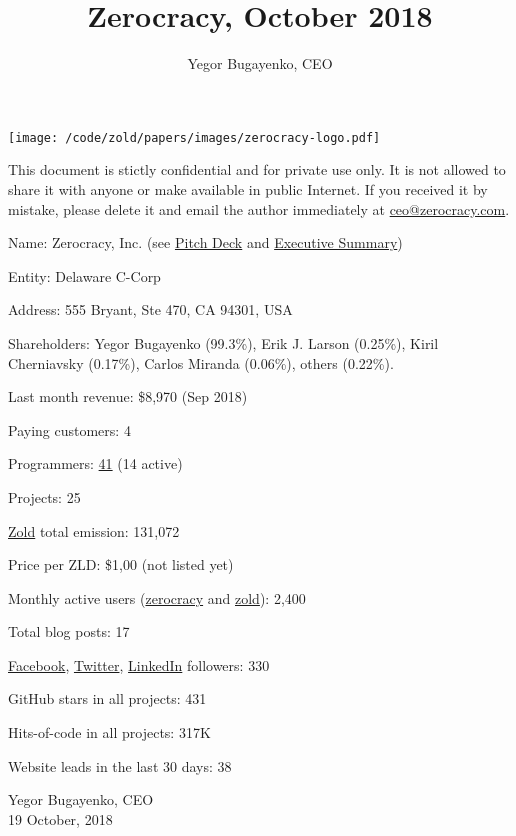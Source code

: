 \documentclass{main}
\title{Zerocracy, October 2018}
\author{Yegor Bugayenko, CEO}
\begin{document}
\texttt{[image: /code/zold/papers/images/zerocracy-logo.pdf]}

{\small
\colorbox{zred}{}
This document is stictly confidential and for private use only.
It is not allowed to share it with anyone or make available in public
Internet. If you received it by mistake, please delete it and email the author
immediately at \href{mailto:ceo@zerocracy.com}{ceo@zerocracy.com}.}

\vspace{2em}

Name: Zerocracy, Inc. (see
  \href{http://papers.zold.io/zerocracy-deck.pdf}{Pitch Deck} and
  \href{http://papers.zold.io/executive-summary.pdf}{Executive Summary})

Entity: Delaware C-Corp

Address: 555 Bryant, Ste 470, CA 94301, USA

Shareholders:
  Yegor Bugayenko (99.3\%),
  Erik J. Larson (0.25\%),
  Kiril Cherniavsky (0.17\%),
  Carlos Miranda (0.06\%),
  others (0.22\%).

Last month revenue: \$8,970 (Sep 2018)

Paying customers: 4

Programmers: \href{https://www.0crat.com/team}{41} (14 active)

Projects: 25

\href{https://www.zold.io}{Zold} total emission: 131,072

Price per ZLD: \$1,00 (not listed yet)

Monthly active users (\href{https://www.zerocracy.com}{zerocracy} and \href{https://www.zold.io}{zold}): 2,400

Total blog posts: 17

\href{https://www.facebook.com/zerocracy/}{Facebook},
  \href{https://twitter.com/0crat}{Twitter},
  \href{https://www.linkedin.com/company/zerocracy/}{LinkedIn} followers: 330

GitHub stars in all projects: 431

Hits-of-code in all projects: 317K

Website leads in the last 30 days: 38

\vspace{2em}

Yegor Bugayenko, CEO\\
19 October, 2018
\end{document}
